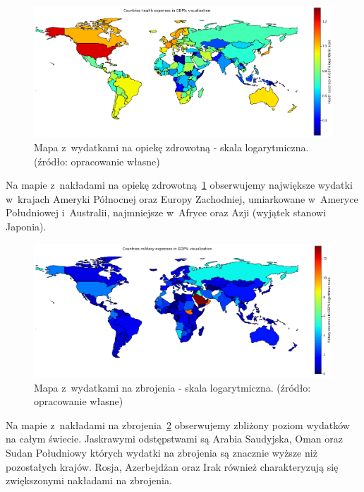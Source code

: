 \documentclass[11pt]{report}
\begin{document}
    \begin{figure}[!htp]
        \centering
        \includegraphics[width=\linewidth]{fig/CLUST/health2015.png}
        \caption{Mapa z~wydatkami na opiekę zdrowotną - skala logarytmiczna. (źródło: opracowanie własne)}
        \label{fig:clustHealth2015_log}
    \end{figure}
    Na mapie z~nakładami na opiekę zdrowotną~\ref{fig:clustHealth2015_log} obserwujemy największe wydatki w~krajach Ameryki Północnej oraz Europy Zachodniej, umiarkowane w~Ameryce Południowej i~Australii, najmniejsze w~Afryce oraz Azji (wyjątek stanowi Japonia).

    \begin{figure}[!htp]
        \centering
        \includegraphics[width=\linewidth]{fig/CLUST/military2015.png}
        \caption{Mapa z~wydatkami na zbrojenia - skala logarytmiczna. (źródło: opracowanie własne)}
        \label{fig:clustMilitary2015_log}
    \end{figure}
    Na mapie z~nakładami na zbrojenia~\ref{fig:clustMilitary2015_log} obserwujemy zbliżony poziom wydatków na całym świecie.
    Jaskrawymi odstępstwami są Arabia Saudyjska, Oman oraz Sudan Południowy których wydatki na zbrojenia są znacznie wyższe niż pozostałych krajów.
    Rosja, Azerbejdżan oraz Irak również charakteryzują się zwiększonymi nakładami na zbrojenia.
\end{document}
